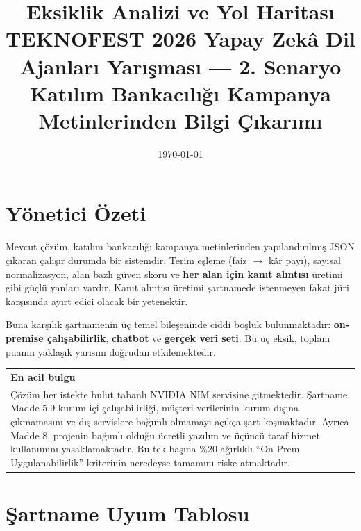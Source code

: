 \documentclass[11pt,a4paper]{article}
\title{\vspace{-1.5cm}\textbf{Eksiklik Analizi ve Yol Haritası}\\[0.3cm]
\large TEKNOFEST 2026 Yapay Zekâ Dil Ajanları Yarışması --- 2. Senaryo\\
\normalsize Katılım Bankacılığı Kampanya Metinlerinden Bilgi Çıkarımı}
\author{}
\date{\today}
\makeatletter
\newenvironment{vurgukutu}[1]
  {\par\vspace{6pt}\noindent
   \begin{tabular}{|@{\hspace{8pt}}p{0.94\textwidth}@{\hspace{8pt}}|}
   \hline\rule{0pt}{16pt}\textcolor{kritik}{\textbf{#1}}\\[4pt]}
  {\\[6pt]\hline
   \end{tabular}\par\vspace{6pt}}
\makeatother
\begin{document}
\maketitle
\thispagestyle{fancy}

\vspace{-1cm}

\section{Yönetici Özeti}

Mevcut çözüm, katılım bankacılığı kampanya metinlerinden yapılandırılmış JSON çıkaran
çalışır durumda bir sistemdir. Terim eşleme (faiz $\rightarrow$ kâr payı), sayısal
normalizasyon, alan bazlı güven skoru ve \textbf{her alan için kanıt alıntısı} üretimi
gibi güçlü yanları vardır. Kanıt alıntısı üretimi şartnamede istenmeyen fakat jüri
karşısında ayırt edici olacak bir yetenektir.

Buna karşılık şartnamenin üç temel bileşeninde ciddi boşluk bulunmaktadır:
\textbf{on-premise çalışabilirlik}, \textbf{chatbot} ve \textbf{gerçek veri seti}.
Bu üç eksik, toplam puanın yaklaşık yarısını doğrudan etkilemektedir.

\begin{vurgukutu}{En acil bulgu}
Çözüm her istekte bulut tabanlı NVIDIA NIM servisine gitmektedir. Şartname Madde 5.9
kurum içi çalışabilirliği, müşteri verilerinin kurum dışına çıkmamasını ve dış
servislere bağımlı olmamayı açıkça şart koşmaktadır. Ayrıca Madde 8, projenin bağımlı
olduğu ücretli yazılım ve üçüncü taraf hizmet kullanımını yasaklamaktadır. Bu tek
başına \%20 ağırlıklı ``On-Prem Uygulanabilirlik'' kriterinin neredeyse tamamını
riske atmaktadır.
\end{vurgukutu}

\section{Şartname Uyum Tablosu}
\end{document}
